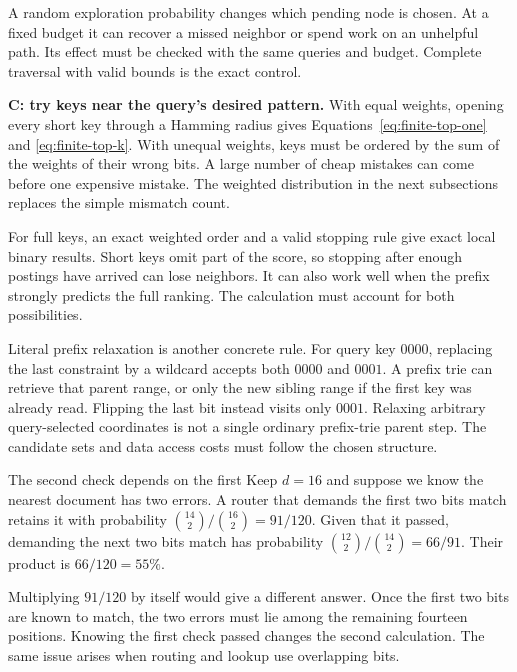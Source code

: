 A random exploration probability changes which pending node is chosen. At a fixed budget it
can recover a missed neighbor or spend work on an unhelpful path. Its effect must be checked
with the same queries and budget. Complete traversal with valid bounds is the exact control.

\textbf{C: try keys near the query's desired pattern.} With equal weights, opening every short
key through a Hamming radius gives Equations~\eqref{eq:finite-top-one} and
\eqref{eq:finite-top-k}. With unequal weights, keys must be ordered by the sum of the weights
of their wrong bits. A large number of cheap mistakes can come before one expensive mistake.
The weighted distribution in the next subsections replaces the simple mismatch count.

For full keys, an exact weighted order and a valid stopping rule give exact local binary
results. Short keys omit part of the score, so stopping after enough postings have arrived can
lose neighbors. It can also work well when the prefix strongly predicts the full ranking.
The calculation must account for both possibilities.

Literal prefix relaxation is another concrete rule. For query key $0000$, replacing the last
constraint by a wildcard accepts both $0000$ and $0001$. A prefix trie can retrieve that parent
range, or only the new sibling range if the first key was already read. Flipping the last bit
instead visits only $0001$. Relaxing arbitrary query-selected coordinates is not a single
ordinary prefix-trie parent step. The candidate sets and data access costs must follow the
chosen structure.

\begin{examplebox}{The second check depends on the first}
Keep $d=16$ and suppose we know the nearest document has two errors. A router that demands the
first two bits match retains it with probability $\binom{14}{2}/\binom{16}{2}=91/120$.
Given that it passed, demanding the next two bits match has probability
$\binom{12}{2}/\binom{14}{2}=66/91$. Their product is $66/120=55\%$.

Multiplying $91/120$ by itself would give a different answer. Once the first two bits are known
to match, the two errors must lie among the remaining fourteen positions. Knowing the first check passed changes
the second calculation. The same issue arises when routing and lookup use overlapping bits.
\end{examplebox}

